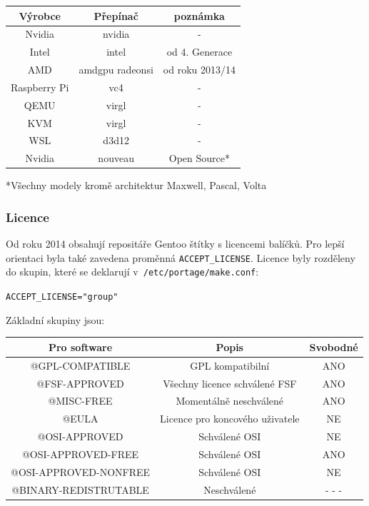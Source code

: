 \documentclass[12pt,a4paper,twoside,]{article}
\begin{document}
{\begin{table}[h]
	\centering
	\begin{tabular}{|c|c|c|}
		\hline
		Výrobce & Přepínač & poznámka \\
		\hline
		Nvidia & nvidia & -\\
		\hline
		Intel & intel & od 4. Generace \\
		\hline
		AMD & amdgpu radeonsi & od roku 2013/14 \\
		\hline
		Raspberry Pi & vc4 & - \\
		\hline
		QEMU&virgl&-\\
		\hline
		KVM&virgl&-\\
		\hline
		WSL&d3d12&- \\
		\hline
		Nvidia & nouveau & Open Source*\\
		\hline
		
	\end{tabular}
\end{table}
*Všechny modely kromě architektur Maxwell, Pascal, Volta
\newpage
\subsubsection{\textsf{Licence}}
Od roku 2014 obsahují repositáře Gentoo štítky s licencemi balíčků. Pro lepší orientaci byla také zavedena proměnná \texttt{ACCEPT\_LICENSE}. Licence byly rozděleny do skupin, které se deklarují v~\texttt{/etc/portage/make.conf}:

\texttt{ACCEPT\_LICENSE="group"}

Základní skupiny jsou:

\begin{table}[h]
	\centering
	\begin{tabular}{|c|c|c|}
		\hline
		Pro software & Popis & Svobodné \\
		\hline
		@GPL-COMPATIBLE & GPL kompatibilní & ANO \\
		\hline
		@FSF-APPROVED & Všechny licence schválené FSF & ANO \\
		\hline
		@MISC-FREE & Momentálně neschválené & ANO \\
		\hline		
		@EULA & Licence pro koncového uživatele & NE \\
		\hline
		@OSI-APPROVED & Schválené OSI & NE \\
		\hline
		@OSI-APPROVED-FREE & Schválené OSI & ANO \\
		\hline
		@OSI-APPROVED-NONFREE & Schválené OSI & NE \\
		\hline
		@BINARY-REDISTRUTABLE & Neschválené & - - - \\
		\hline


\end{tabular}
\end{table}}
\end{document}
